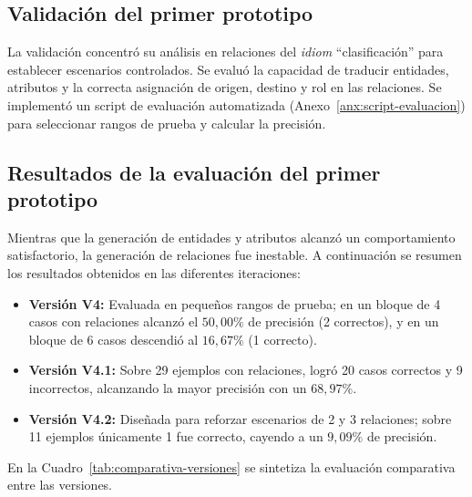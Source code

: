 \subsection{Validación del primer prototipo}
\label{subsec:p1-validacion}

La validación concentró su análisis en relaciones del \textit{idiom} ``clasificación'' para establecer escenarios controlados. Se evaluó la capacidad de traducir entidades, atributos y la correcta asignación de origen, destino y rol en las relaciones. Se implementó un script de evaluación automatizada (Anexo~\ref{anx:script-evaluacion}) para seleccionar rangos de prueba y calcular la precisión.

\subsection{Resultados de la evaluación del primer prototipo}
\label{subsec:p1-resultados}

Mientras que la generación de entidades y atributos alcanzó un comportamiento satisfactorio, la generación de relaciones fue inestable. A continuación se resumen los resultados obtenidos en las diferentes iteraciones:

\begin{itemize}
    \item \textbf{Versión V4:} Evaluada en pequeños rangos de prueba; en un bloque de 4 casos con relaciones alcanzó el $50{,}00\%$ de precisión (2 correctos), y en un bloque de 6 casos descendió al $16{,}67\%$ (1 correcto).
    \item \textbf{Versión V4.1:} Sobre 29 ejemplos con relaciones, logró 20 casos correctos y 9 incorrectos, alcanzando la mayor precisión con un \textbf{$68{,}97\%$}.
    \item \textbf{Versión V4.2:} Diseñada para reforzar escenarios de 2 y 3 relaciones; sobre 11 ejemplos únicamente 1 fue correcto, cayendo a un \textbf{$9{,}09\%$} de precisión.
\end{itemize}

En la Cuadro~\ref{tab:comparativa-versiones} se sintetiza la evaluación comparativa entre las versiones.

